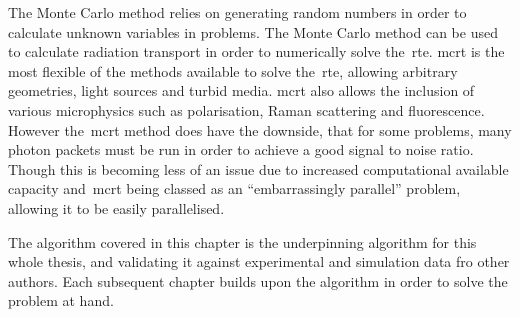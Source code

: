 The Monte Carlo method relies on generating random numbers in order to calculate unknown variables in problems.
The Monte Carlo method can be used to calculate radiation transport in order to numerically solve the~\gls*{rte}.
\Gls*{mcrt} is the most flexible of the methods available to solve the~\gls*{rte}, allowing arbitrary geometries, light sources and turbid media.
\Gls*{mcrt} also allows the inclusion of various microphysics such as polarisation, Raman scattering and fluorescence.
However the~\gls*{mcrt} method does have the downside, that for some problems, many photon packets must be run in order to achieve a good signal to noise ratio.
Though this is becoming less of an issue due to increased computational available capacity and~\gls*{mcrt} being classed as an ``embarrassingly parallel'' problem, allowing it to be easily parallelised.

The algorithm covered in this chapter is the underpinning algorithm for this whole thesis, and validating it against experimental and simulation data fro other authors.
Each subsequent chapter builds upon the algorithm in order to solve the problem at hand.